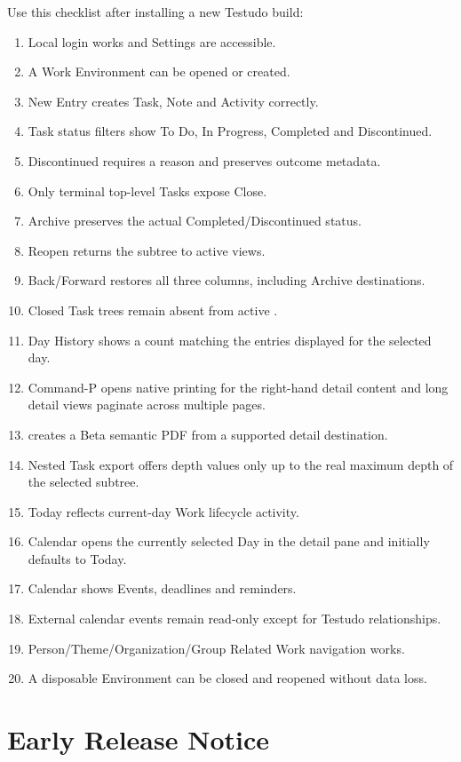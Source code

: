 \documentclass{testudomanual}
\begin{document}
Use this checklist after installing a new Testudo build:
\begin{enumerate}
    \item Local login works and Settings are accessible.
    \item A Work Environment can be opened or created.
    \item New Entry creates Task, Note and Activity correctly.
    \item Task status filters show To Do, In Progress, Completed and Discontinued.
    \item Discontinued requires a reason and preserves outcome metadata.
    \item Only terminal top-level Tasks expose Close.
    \item Archive preserves the actual Completed/Discontinued status.
    \item Reopen returns the subtree to active views.
    \item Back/Forward restores all three columns, including Archive destinations.
    \item Closed Task trees remain absent from active .
    \item Day History shows a count matching the entries displayed for the selected day.
    \item Command-P opens native printing for the right-hand detail content and long detail views paginate across multiple pages.
    \item {} creates a Beta semantic PDF from a supported detail destination.
    \item Nested Task export offers depth values only up to the real maximum depth of the selected subtree.
    \item Today reflects current-day Work lifecycle activity.
    \item Calendar opens the currently selected Day in the detail pane and initially defaults to Today.
    \item Calendar shows Events, deadlines and reminders.
    \item External calendar events remain read-only except for Testudo relationships.
    \item Person/Theme/Organization/Group Related Work navigation works.
    \item A disposable Environment can be closed and reopened without data loss.
\end{enumerate}

\chapter{Early Release Notice}
\end{document}
